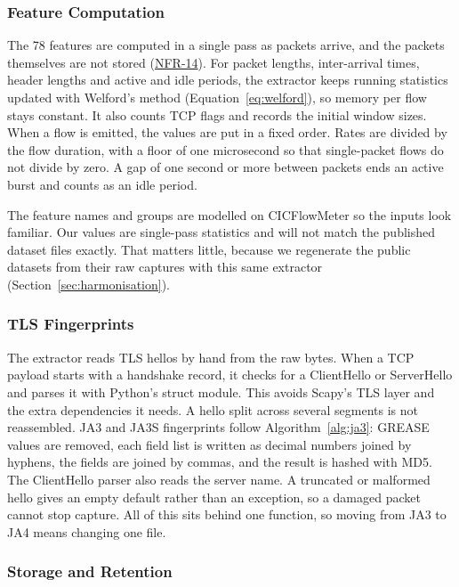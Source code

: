 \subsubsection{Feature Computation}\label{sec:7.1.5.3}

\noindent The 78 features are computed in a single pass as packets arrive, and the packets themselves are not stored (\hyperlink{req:NFR-14}{NFR-14}). For packet lengths, inter-arrival times, header lengths and active and idle periods, the extractor keeps running statistics updated with Welford's method (Equation~\ref{eq:welford}), so memory per flow stays constant. It also counts TCP flags and records the initial window sizes. When a flow is emitted, the values are put in a fixed order. Rates are divided by the flow duration, with a floor of one microsecond so that single-packet flows do not divide by zero. A gap of one second or more between packets ends an active burst and counts as an idle period.

\noindent The feature names and groups are modelled on CICFlowMeter so the inputs look familiar. Our values are single-pass statistics and will not match the published dataset files exactly. That matters little, because we regenerate the public datasets from their raw captures with this same extractor (Section~\ref{sec:harmonisation}).

\subsubsection{TLS Fingerprints}\label{sec:7.1.5.4}

\noindent The extractor reads TLS hellos by hand from the raw bytes. When a TCP payload starts with a handshake record, it checks for a ClientHello or ServerHello and parses it with Python's struct module. This avoids Scapy's TLS layer and the extra dependencies it needs. A hello split across several segments is not reassembled. JA3 and JA3S fingerprints follow Algorithm~\ref{alg:ja3}: GREASE values are removed, each field list is written as decimal numbers joined by hyphens, the fields are joined by commas, and the result is hashed with MD5. The ClientHello parser also reads the server name. A truncated or malformed hello gives an empty default rather than an exception, so a damaged packet cannot stop capture. All of this sits behind one function, so moving from JA3 to JA4 means changing one file.

\subsubsection{Storage and Retention}\label{sec:7.1.5.5}

